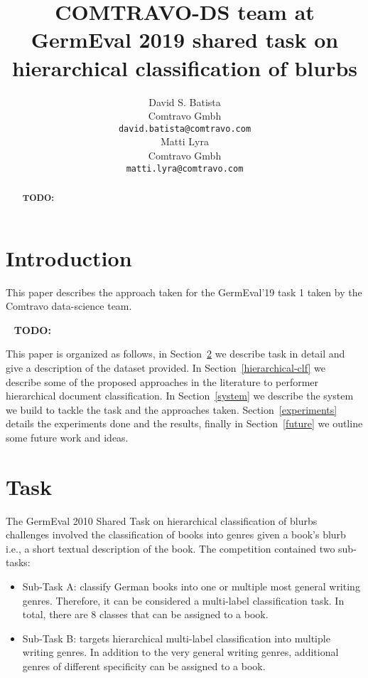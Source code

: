 \documentclass[11pt,a4paper]{article}
\title{COMTRAVO-DS team at GermEval 2019 shared task on hierarchical classification of blurbs}
\author{David S. Batista \\
  Comtravo Gmbh \\
  {\tt david.batista@comtravo.com} \\\And
  Matti Lyra \\
  Comtravo Gmbh \\
  {\tt matti.lyra@comtravo.com} \\}
\date{}
\begin{document}
\maketitle
\begin{abstract}
\textbf{TODO:}
\ \newline
\end{abstract}


\section{Introduction}

This paper describes the approach taken for the GermEval'19 task 1 taken by the Comtravo data-science team.

\ \newline
\textbf{TODO:}
\ \newline

This paper is organized as follows, in Section~\ref{task} we describe task in detail and give a description of the dataset provided. In Section~\ref{hierarchical-clf} we describe some of the proposed approaches in the literature to performer hierarchical document classification. In Section~\ref{system} we describe the system we build to tackle the task and the approaches taken. Section~\ref{experiments} details the experiments done and the results, finally in Section~\ref{future} we outline some future work and ideas.

\section{Task}\label{task}

The GermEval 2010 Shared Task on hierarchical classification of blurbs challenges involved the
classification of books into genres given a book's blurb i.e., a short textual description of the
book. The competition contained two sub-tasks:

\begin{itemize}

\item Sub-Task A: classify German books into one or multiple most general writing genres. Therefore,
it can be considered a multi-label classification task. In total, there are 8 classes that can be
assigned to a book.

\item Sub-Task B: targets hierarchical multi-label classification into multiple writing genres. In
addition to the very general writing genres, additional genres of different specificity can
be assigned to a book.

\end{itemize}
\end{document}
